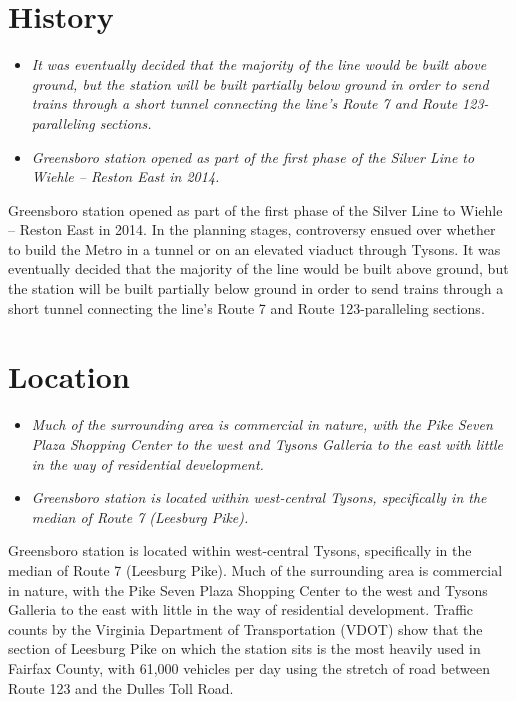 \section{History}\label{history}

\begin{itemize}
\item
  \emph{It was eventually decided that the majority of the line would be
  built above ground, but the station will be built partially below
  ground in order to send trains through a short tunnel connecting the
  line's Route 7 and Route 123-paralleling sections.}
\item
  \emph{Greensboro station opened as part of the first phase of the
  Silver Line to Wiehle -- Reston East in 2014.}
\end{itemize}

Greensboro station opened as part of the first phase of the Silver Line
to Wiehle -- Reston East in 2014. In the planning stages, controversy
ensued over whether to build the Metro in a tunnel or on an elevated
viaduct through Tysons. It was eventually decided that the majority of
the line would be built above ground, but the station will be built
partially below ground in order to send trains through a short tunnel
connecting the line's Route 7 and Route 123-paralleling sections.

\section{Location}\label{location}

\begin{itemize}
\item
  \emph{Much of the surrounding area is commercial in nature, with the
  Pike Seven Plaza Shopping Center to the west and Tysons Galleria to
  the east with little in the way of residential development.}
\item
  \emph{Greensboro station is located within west-central Tysons,
  specifically in the median of Route 7 (Leesburg Pike).}
\end{itemize}

Greensboro station is located within west-central Tysons, specifically
in the median of Route 7 (Leesburg Pike). Much of the surrounding area
is commercial in nature, with the Pike Seven Plaza Shopping Center to
the west and Tysons Galleria to the east with little in the way of
residential development. Traffic counts by the Virginia Department of
Transportation (VDOT) show that the section of Leesburg Pike on which
the station sits is the most heavily used in Fairfax County, with 61,000
vehicles per day using the stretch of road between Route 123 and the
Dulles Toll Road.

